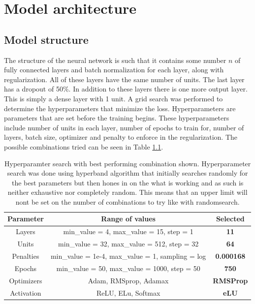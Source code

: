 
\chapter{Model architecture} %

\label{Chapter4} %


\section{Model structure}
The structure of the neural network is such that it contains some number $n$ of fully connected layers and batch normalization for each layer, along with regularization. All of these layers have the same number of units. The last layer has a dropout of 50\%. In addition to these layers there is one more output layer. This is simply a dense layer with 1 unit. A grid search was performed to determine the hyperparameters that minimize the loss. Hyperparameters are parameters that are set before the training begins\cite{hyperparameters_definition}. These hyperparameters include number of units in each layer, number of epochs to train for, number of layers, batch size, optimizer and penalty to enforce in the regularization. The possible combinations tried can be seen in Table \ref{table:gridSearchHyperparamters}.

\begin{table}[h]
    \centering
    \caption[Hyperparamter search with best performing combination.]{Hyperparamter search with best performing combination shown. Hyperparameter search was done using hyperband algorithm that initially searches randomly for the best parameters but then hones in on the what is working and as such is neither exhaustive nor completely random. This means that an upper limit will nont be set on the number of combinations to try like with randomsearch.}
    \label{table:gridSearchHyperparamters}
    \begin{tabular}{c|c|c}
        Parameter & Range of values & Selected\\\hline
        Layers &  min\_value = 4, max\_value = 15, step = 1 & \textbf{11}\\\hline
        Units &  min\_value = 32, max\_value = 512, step = 32 & \textbf{64}\\\hline
        Penalties & min\_value = 1e-4, max\_value = 1, sampling = log & \textbf{0.000168}\\\hline
        Epochs & min\_value = 50, max\_value = 1000, step = 50 & \textbf{750}\\\hline
        Optimizers & Adam, RMSprop, Adamax & \textbf{RMSProp}\\\hline
        Activation & ReLU, ELu, Softmax & \textbf{eLU}\\\hline
    \end{tabular}
\end{table}

